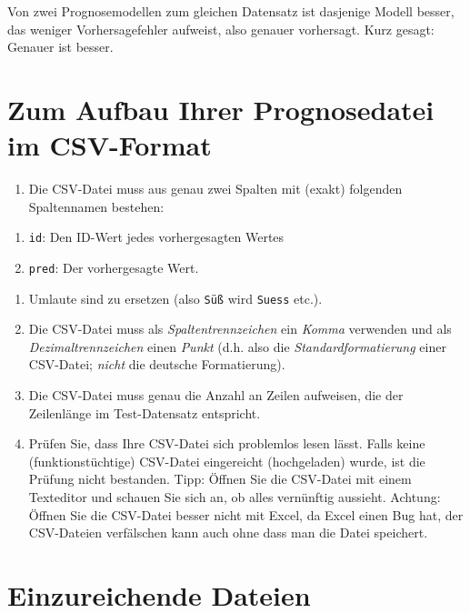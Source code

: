 \documentclass[
]{book}
\providecommand{\tightlist}{%
  \setlength{\itemsep}{0pt}\setlength{\parskip}{0pt}}
\begin{document}
Von zwei Prognosemodellen zum gleichen Datensatz ist dasjenige Modell besser,
das weniger Vorhersagefehler aufweist, also genauer vorhersagt.
Kurz gesagt: Genauer ist besser.

\hypertarget{zum-aufbau-ihrer-prognosedatei-im-csv-format}{%
\section{Zum Aufbau Ihrer Prognosedatei im CSV-Format}\label{zum-aufbau-ihrer-prognosedatei-im-csv-format}}

\begin{enumerate}
\def\labelenumi{\arabic{enumi}.}
\tightlist
\item
  Die CSV-Datei muss aus genau zwei Spalten mit (exakt) folgenden Spaltennamen bestehen:
\end{enumerate}

\begin{enumerate}
\def\labelenumi{\alph{enumi})}
\tightlist
\item
  \texttt{id}: Den ID-Wert jedes vorhergesagten Wertes
\item
  \texttt{pred}: Der vorhergesagte Wert.
\end{enumerate}

\begin{enumerate}
\def\labelenumi{\arabic{enumi}.}
\setcounter{enumi}{2}
\item
  Umlaute sind zu ersetzen (also \texttt{Süß} wird \texttt{Suess} etc.).
\item
  Die CSV-Datei muss als \emph{Spaltentrennzeichen} ein \emph{Komma} verwenden und als \emph{Dezimaltrennzeichen} einen \emph{Punkt} (d.h. also die \emph{Standardformatierung} einer CSV-Datei; \emph{nicht} die deutsche Formatierung).
\item
  Die CSV-Datei muss genau die Anzahl an Zeilen aufweisen, die der Zeilenlänge im Test-Datensatz entspricht.
\item
  Prüfen Sie, dass Ihre CSV-Datei sich problemlos lesen lässt.
  Falls keine (funktionstüchtige) CSV-Datei eingereicht (hochgeladen) wurde, ist die Prüfung nicht bestanden.
  Tipp: Öffnen Sie die CSV-Datei mit einem Texteditor und schauen Sie sich an, ob alles vernünftig aussieht.
  Achtung: Öffnen Sie die CSV-Datei besser nicht mit Excel, da Excel einen Bug hat,
  der CSV-Dateien verfälschen kann auch ohne dass man die Datei speichert.
\end{enumerate}

\hypertarget{einzureichende-dateien}{%
\section{Einzureichende Dateien}\label{einzureichende-dateien}}
\end{document}

